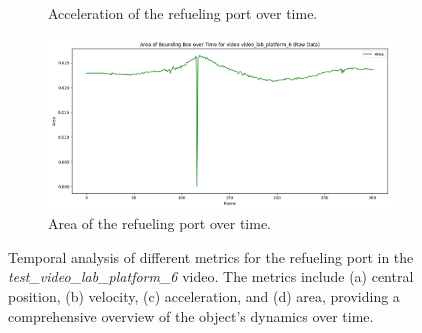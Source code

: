 \documentclass[12pt,oneside]{book} %
\begin{document}
\begin{figure}[H]
\begin{subfigure}[t]{0.6\textwidth}
        \caption{Acceleration of the refueling port over time.}
        \label{fig:acceleration-test-video_lab_platform_6}
    \end{subfigure}
    \hfill
    \begin{subfigure}[t]{0.6\textwidth}
        \includegraphics[width=\textwidth]{figures/bbox_metrics/video_lab_platform_6 (Raw Data)_area.png}
        \caption{Area of the refueling port over time.}
        \label{fig:size-test-video_lab_platform_6}
    \end{subfigure}
    \caption{Temporal analysis of different metrics for the refueling port in the \textit{test\_video\_lab\_platform\_6} video. The metrics include (a) central position, (b) velocity, (c) acceleration, and (d) area, providing a comprehensive overview of the object's dynamics over time.}
    \label{fig:bbox-metrics-test-video_lab_platform_6}
\end{figure}
\end{document}
